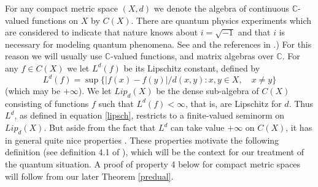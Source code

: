 \documentclass{amsart}[14pt]
\theoremstyle{definition}
\theoremstyle{remark}
\newcommand{\bC}{{\mathbb C}}
\newcommand{\<}{\langle}
\renewcommand{\>}{\rangle}
\numberwithin{equation}{section}
\begin{document}
{For any compact metric space $(X,d)$ we denote
the algebra of continuous $\bC$-valued functions
on $X$ by $C(X)$. There are quantum physics experiments
which are considered to indicate that nature knows
about $i = \sqrt {-1}$ and that $i$ is necessary for
modeling quantum phenomena. See \cite{RAN}
and the references in \cite{LnP}.) For this reason
we will usually use $\bC$-valued functions, and
matrix algebras over $\bC$.
For any $f \in C(X)$ we let
$L^d(f)$ be its Lipschitz constant, defined by
\begin{equation}
\label{lipsch}
L^d(f) = \sup \{|f(x) - f(y)|/d(x,y): x, y\in X, \quad x \neq y\}
\end{equation} 
(which may be $+\infty$).
We let $Lip_d(X)$ be the dense sub-algebra of $C(X)$
consisting of functions $f$ such that $L^d(f) < \infty$, that is, are
Lipschitz for $d $. Thus $L^d$, as defined in equation
\ref{lipsch}, restricts to a finite-valued seminorm on $Lip_d(X)$. 
But aside from the fact that $L^d$ can take value $+\infty$
on $C(X)$, 
it has in general quite nice properties
\cite{R4, R5, R21}. These properties
motivate the following definition (see definition 4.1 of \cite{R21}), 
which will be the context for
our treatment of the quantum situation. A proof of property
4 below for compact metric spaces will follow 
from our later Theorem \ref{predual}.

}
\end{document}
